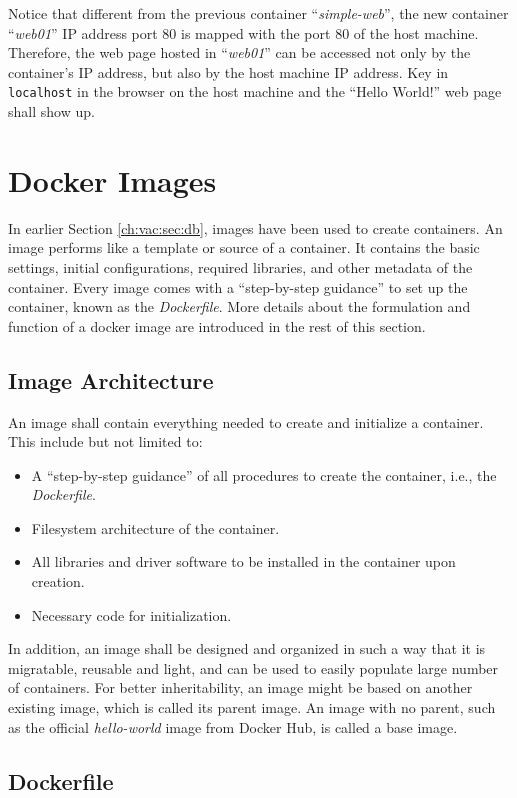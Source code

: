 Notice that different from the previous container ``\textit{simple-web}'', the new container ``\textit{web01}'' IP address port 80 is mapped with the port 80 of the host machine. Therefore, the web page hosted in ``\textit{web01}'' can be accessed not only by the container's IP address, but also by the host machine IP address. Key in \verb|localhost| in the browser on the host machine and the ``Hello World!'' web page shall show up.

\section{Docker Images}

In earlier Section \ref{ch:vac:sec:db}, images have been used to create containers. An image performs like a template or source of a container. It contains the basic settings, initial configurations, required libraries, and other metadata of the container. Every image comes with a ``step-by-step guidance'' to set up the container, known as the \textit{Dockerfile}. More details about the formulation and function of a docker image are introduced in the rest of this section.

\subsection{Image Architecture}

An image shall contain everything needed to create and initialize a container. This include but not limited to:
\begin{itemize}
  \item A ``step-by-step guidance'' of all procedures to create the container, i.e., the \textit{Dockerfile}.
  \item Filesystem architecture of the container.
  \item All libraries and driver software to be installed in the container upon creation.
  \item Necessary code for initialization.
\end{itemize} 
In addition, an image shall be designed and organized in such a way that it is migratable, reusable and light, and can be used to easily populate large number of containers. For better inheritability, an image might be based on another existing image, which is called its parent image. An image with no parent, such as the official \textit{hello-world} image from Docker Hub, is called a base image.

\subsection{Dockerfile}

